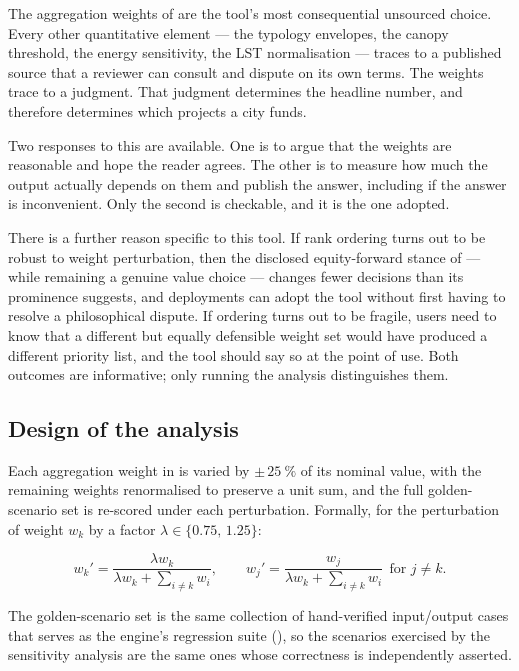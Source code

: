 The aggregation weights of  are the tool's most
consequential unsourced choice. Every other quantitative element --- the
typology envelopes, the canopy threshold, the energy sensitivity, the LST
normalisation --- traces to a published source that a reviewer can consult and
dispute on its own terms. The weights trace to a judgment. That judgment
determines the headline number, and therefore determines which projects a city
funds.

Two responses to this are available. One is to argue that the weights are
reasonable and hope the reader agrees. The other is to measure how much the
output actually depends on them and publish the answer, including if the answer
is inconvenient. Only the second is checkable, and it is the one adopted.

There is a further reason specific to this tool. If rank ordering turns out to
be robust to weight perturbation, then the disclosed equity-forward stance of
 --- while remaining a genuine value choice ---
changes fewer decisions than its prominence suggests, and deployments can adopt
the tool without first having to resolve a philosophical dispute. If ordering
turns out to be fragile, users need to know that a different but equally
defensible weight set would have produced a different priority list, and the
tool should say so at the point of use. Both outcomes are informative; only
running the analysis distinguishes them.

\subsection{Design of the analysis}

Each aggregation weight in  is varied by
$\pm\,\SI{25}{\percent}$ of its nominal value, with the remaining weights
renormalised to preserve a unit sum, and the full golden-scenario set is
re-scored under each perturbation. Formally, for the perturbation of weight
$w_k$ by a factor $\lambda \in \{0.75,\, 1.25\}$:

\begin{equation}
\label{eq:perturbation}
w_k' = \frac{\lambda w_k}{\lambda w_k + \sum_{i \neq k} w_i},
\qquad
w_j' = \frac{w_j}{\lambda w_k + \sum_{i \neq k} w_i}\ \ \text{for } j \neq k .
\end{equation}

The golden-scenario set is the same collection of hand-verified
input/output cases that serves as the engine's regression suite
(), so the scenarios exercised by the sensitivity
analysis are the same ones whose correctness is independently asserted.

